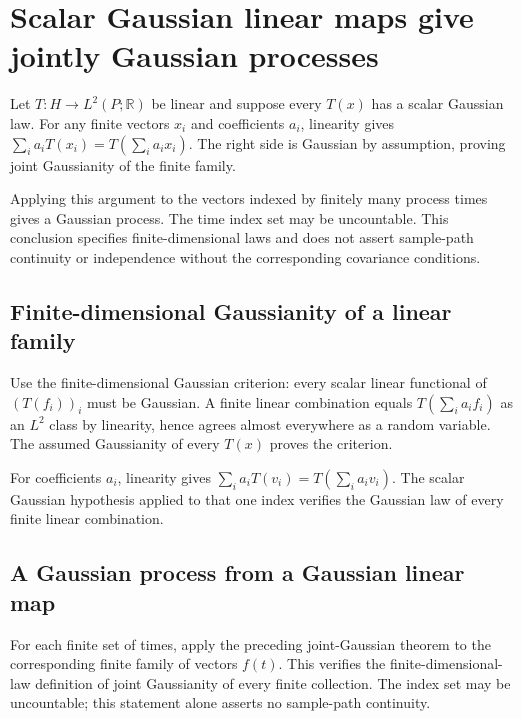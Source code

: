 \documentclass[11pt,a4paper]{article}
\begin{document}
\section{\texorpdfstring{Scalar Gaussian linear maps give jointly Gaussian processes}{Scalar Gaussian linear maps give jointly Gaussian processes}}


Let \(T:H\to L^2(P;\mathbb R)\) be linear and suppose every \(T(x)\) has a scalar Gaussian law. For any finite vectors \(x_i\) and coefficients \(a_i\), linearity gives \(\sum_i a_iT(x_i)=T(\sum_i a_ix_i)\). The right side is Gaussian by assumption, proving joint Gaussianity of the finite family.



Applying this argument to the vectors indexed by finitely many process times gives a Gaussian process. The time index set may be uncountable. This conclusion specifies finite-dimensional laws and does not assert sample-path continuity or independence without the corresponding covariance conditions.


\subsection{\texorpdfstring{Finite-dimensional Gaussianity of a linear family}{Finite-dimensional Gaussianity of a linear family}}


Use the finite-dimensional Gaussian criterion: every scalar linear functional of \((T(f_i))_i\) must be Gaussian. A finite linear combination equals \(T(\sum_i a_if_i)\) as an \(L^2\) class by linearity, hence agrees almost everywhere as a random variable. The assumed Gaussianity of every \(T(x)\) proves the criterion.



For coefficients \(a_i\), linearity gives \(\sum_i a_iT(v_i)=T(\sum_i a_iv_i)\). The scalar Gaussian hypothesis applied to that one index verifies the Gaussian law of every finite linear combination.


\subsection{\texorpdfstring{A Gaussian process from a Gaussian linear map}{A Gaussian process from a Gaussian linear map}}


For each finite set of times, apply the preceding joint-Gaussian theorem to the corresponding finite family of vectors \(f(t)\). This verifies the finite-dimensional-law definition of joint Gaussianity of every finite collection. The index set may be uncountable; this statement alone asserts no sample-path continuity.
\end{document}
